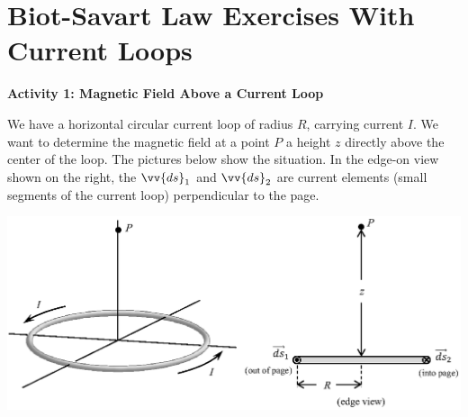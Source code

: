 \section{Biot-Savart Law Exercises With Current Loops}

\makelabheader %

\bigskip

\textbf{Activity 1: Magnetic Field Above a Current Loop}

We have a horizontal 
circular current loop of radius $R$, carrying
current $I$.  We want to determine the magnetic field at a point $P$ a
height $z$ directly above the center of the loop.
The pictures below show the situation.  In the edge-on view shown on the right, 
the $\vv{ds}_1$ and $\vv{ds}_2$ are current elements (small segments of the current loop) perpendicular
to the page.

\vskip 0.5in
\begin{center}
\includegraphics{biot_savart_above_loops/circular_loop_3d.eps}
\end{center}

